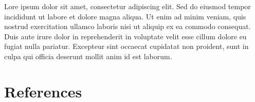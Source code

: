 \documentclass[
  11pt,
  a4paper,
  DIV=11,
  numbers=noendperiod]{scrartcl}
\begin{document}
Lore ipsum dolor sit amet, consectetur adipiscing elit. Sed do eiusmod
tempor incididunt ut labore et dolore magna aliqua. Ut enim ad minim
veniam, quis nostrud exercitation ullamco laboris nisi ut aliquip ex ea
commodo consequat. Duis aute irure dolor in reprehenderit in voluptate
velit esse cillum dolore eu fugiat nulla pariatur. Excepteur sint
occaecat cupidatat non proident, sunt in culpa qui officia deserunt
mollit anim id est laborum.

\newpage{}

\section{References}\label{references}

\label{refs}
\end{document}
